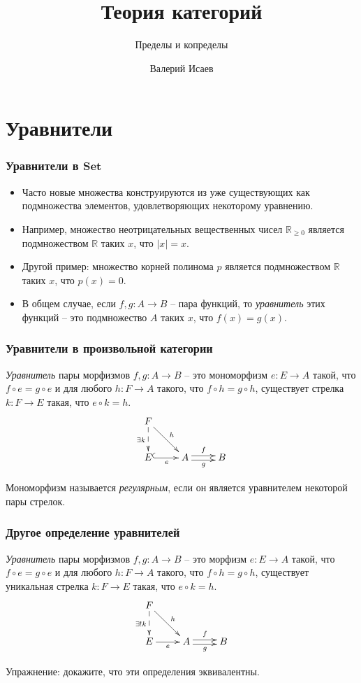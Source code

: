\documentclass{beamer}
\theoremstyle{definition}
\newcommand{\cat}[1]{\mathbf{#1}}
\newcommand{\Set}{\cat{Set}}
\begin{document}
\title{Теория категорий}
\subtitle{Пределы и копределы}
\author{Валерий Исаев}
\maketitle

\section{Уравнители}

\begin{frame}
\frametitle{Уравнители в $\Set$}
\begin{itemize}
\item Часто новые множества конструируются из уже существующих как подмножества элементов, удовлетворяющих некоторому уравнению.
\item Например, множество неотрицательных вещественных чисел $\mathbb{R}_{\geq 0}$ является подмножеством $\mathbb{R}$ таких $x$, что $|x| = x$.
\item Другой пример: множество корней полинома $p$ является подмножеством $\mathbb{R}$ таких $x$, что $p(x) = 0$.
\item В общем случае, если $f, g : A \to B$ -- пара функций, то \emph{уравнитель} этих функций -- это подмножество $A$ таких $x$, что $f(x) = g(x)$.
\end{itemize}
\end{frame}

\begin{frame}
\frametitle{Уравнители в произвольной категории}
\emph{Уравнитель} пары морфизмов $f, g : A \to B$ -- это мономорфизм $e : E \to A$ такой, что $f \circ e = g \circ e$ и для любого $h : F \to A$ такого, что $f \circ h = g \circ h$, существует стрелка $k : F \to E$ такая, что $e \circ k = h$.
\[ \xymatrix{ F \ar@{-->}[d]_{\exists k} \ar[dr]^h \\
              E \ar@{^{(}->}[r]_e & A \ar@<-.5ex>[r]_g \ar@<.5ex>[r]^f & B
            } \]

Мономорфизм называется \emph{регулярным}, если он является уравнителем некоторой пары стрелок.
\end{frame}

\begin{frame}
\frametitle{Другое определение уравнителей}
\emph{Уравнитель} пары морфизмов $f, g : A \to B$ -- это морфизм $e : E \to A$ такой, что $f \circ e = g \circ e$ и для любого $h : F \to A$ такого, что $f \circ h = g \circ h$, существует уникальная стрелка $k : F \to E$ такая, что $e \circ k = h$.
\[ \xymatrix{ F \ar@{-->}[d]_{\exists ! k} \ar[dr]^h \\
              E \ar[r]_e & A \ar@<-.5ex>[r]_g \ar@<.5ex>[r]^f & B
            } \]

Упражнение: докажите, что эти определения эквивалентны.
\end{frame}
\end{document}
